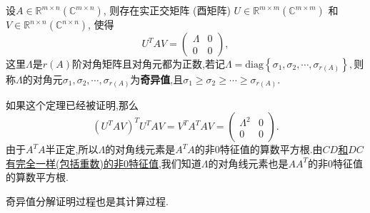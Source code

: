 \documentclass[../../main.tex]{subfiles}%
\begin{document}
\begin{theorem}\label{theorem:奇异值分解}
设\( A \in \mathbb{R}^{m \times n} (\mathbb{C}^{m \times n}) \), 则存在实正交矩阵 (酉矩阵) \( U \in \mathbb{R}^{m \times m} (\mathbb{C}^{m \times m}) \) 和 \( V \in \mathbb{R}^{n \times n} (\mathbb{C}^{n \times n}) \), 使得
\[
U^T A V = \begin{pmatrix}
\Lambda & 0 \\
0 & 0
\end{pmatrix},
\]
这里\( \Lambda \)是\( r(A) \)阶对角矩阵且对角元都为正数,若记$\Lambda=\mathrm{diag}\left\{ \sigma _1,\sigma _2,\cdots ,\sigma _{r\left( A \right)} \right\},$则称$\Lambda $的对角元$\sigma _1,\sigma _2,\cdots ,\sigma _{r\left( A \right)}$为\textbf{奇异值},且$\sigma _1\geqslant \sigma _2\geqslant \cdots \geqslant \sigma _{r\left( A \right)}.$
\end{theorem}
\begin{remark}
如果这个定理已经被证明,那么
\[
(U^T A V)^T U^T A V = V^T A^T A V = \begin{pmatrix}
\Lambda^2 & 0 \\
0 & 0
\end{pmatrix}.
\]
由于\( A^T A \)半正定,所以\( \Lambda \)的对角线元素是\( A^T A \)的非0特征值的算数平方根.由\hyperref[theorem:AB和BA的非0特征值的Jordan块完全一致]{\( CD \)和\( DC \)有完全一样(包括重数)的非0特征值},我们知道\( \Lambda \)的对角线元素也是\( AA^T \)的非0特征值的算数平方根.
\end{remark}
\begin{remark}
奇异值分解证明过程也是其计算过程.
\end{remark}
\end{document}
